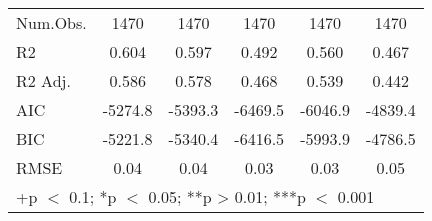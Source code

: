 \begin{table}
\begin{tabular}[t]{lccccc}
Num.Obs. & 1470 & 1470 & 1470 & 1470 & 1470\\
R2 & 0.604 & 0.597 & 0.492 & 0.560 & 0.467\\
R2 Adj. & 0.586 & 0.578 & 0.468 & 0.539 & 0.442\\
AIC & -5274.8 & -5393.3 & -6469.5 & -6046.9 & -4839.4\\
BIC & -5221.8 & -5340.4 & -6416.5 & -5993.9 & -4786.5\\
RMSE & 0.04 & 0.04 & 0.03 & 0.03 & 0.05\\
\bottomrule
\multicolumn{6}{l}{\rule{0pt}{1em}+p $<$ 0.1; *p $<$ 0.05; **p > 0.01; ***p $<$ 0.001}\\
\end{tabular}
\end{table}

